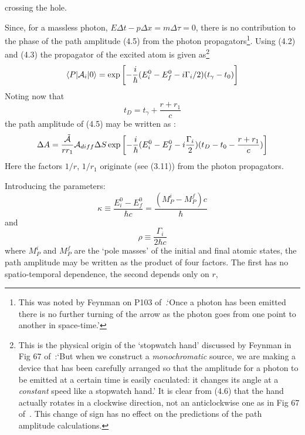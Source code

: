 {  crossing the hole.
  \par Since, for a massless photon, $E\Delta t- p \Delta x = m \Delta \tau = 0$, there is no
  contribution to the phase of the path amplitude (4.5) from the photon propagators\footnote{
   This was noted by Feynman on P103 of~\cite{Feyn1}.`Once a photon has been emitted there is no
   further turning of the arrow as the photon goes from one point to another in space-time.'}. Using (4.2) and
  (4.3) the propagator of the excited atom is given as\footnote{This is the physical origin of the
  `stopwatch hand' discussed by Feynman in Fig 67 of~\cite{Feyn1}:`But when we construct a {\it monochromatic}
  source, we are making a device that has been carefully arranged so that the amplitude for a photon to
  be emitted at a certain time is easily caculated: it changes its angle at a {\it constant} speed like a
  stopwatch hand.' It is clear from (4.6) that the hand actually rotates in a clockwise direction, 
  not an anticlockwise one as in  Fig 67 of~\cite{Feyn1}. This change of sign has no effect on the
   predictions of the path amplitude calculations.}
  \begin{equation}
  \langle P|{\cal A}_i| 0 \rangle =  \exp\left[ -\frac{i}{\hbar}(E_i^0-E_f^0-i\Gamma_i/2)(t_{\gamma}-t_0)\right]
 \end{equation}
  Noting now that
   \begin{equation}
     t_D = t_{\gamma} + \frac{r+r_1}{c}
 \end{equation}
 the path amplitude of (4.5) may be written as :
  \begin{equation}
  \Delta A = \frac{\tilde{{\cal A}}}{r r_1} {\cal A}_{diff} \Delta S
   \exp\left[ -\frac{i}{\hbar}(E_i^0-E_f^0-i\frac{\Gamma_i}{2})(t_D-t_0- \frac{r+r_1}{c})\right]  
 \end{equation}
   Here the factors $1/r$, $1/r_1$ originate (see (3.11)) from the photon propagators. 
  \par Introducing the parameters:
    \begin{equation}
    \kappa \equiv \frac{E_i^0-E_f^0}{\hbar c} =  \frac{(M_P^i-M_P^f)c}{\hbar}
   \end{equation}
   and
  \begin{equation}
  \rho   \equiv \frac{\Gamma_i}{2\hbar c}
   \end{equation}
   where $M_P^i$ and $M_P^f$ are the `pole masses' of the initial and final
   atomic states, 
 the path amplitude may be written as the product of four factors. The first has no
  spatio-temporal dependence, the second depends only on $r$, 
}

